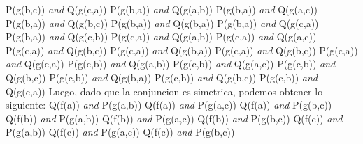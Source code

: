 \documentclass[12pt,a4paper,spanish]{article}
\begin{document}
\begin{enumerate}
   P(g(b,c)) \emph{and} Q(g(c,a))
   \newline
   \newline
   P(g(b,a)) \emph{and} Q(g(a,b))
   \newline
   P(g(b,a)) \emph{and} Q(g(a,c))
   \newline
   P(g(b,a)) \emph{and} Q(g(b,c))
   \newline
   P(g(b,a)) \emph{and} Q(g(b,a))
   \newline
   P(g(b,a)) \emph{and} Q(g(c,a))
   \newline
   P(g(b,a)) \emph{and} Q(g(c,b))
   \newline
   P(g(c,a)) \emph{and} Q(g(a,b))
   \newline
   P(g(c,a)) \emph{and} Q(g(a,c))
   \newline
   P(g(c,a)) \emph{and} Q(g(b,c))
   \newline
   P(g(c,a)) \emph{and} Q(g(b,a))
   \newline
   P(g(c,a)) \emph{and} Q(g(b,c))
   \newline
   P(g(c,a)) \emph{and} Q(g(c,a))
   \newline
   P(g(c,b)) \emph{and} Q(g(a,b))
   \newline
   P(g(c,b)) \emph{and} Q(g(a,c))
   \newline
   P(g(c,b)) \emph{and} Q(g(b,c))
   \newline
   P(g(c,b)) \emph{and} Q(g(b,a))
   \newline
   P(g(c,b)) \emph{and} Q(g(b,c))
   \newline
   P(g(c,b)) \emph{and} Q(g(c,a))
   \newline
   \newline   
   Luego, dado que la conjuncion es simetrica, podemos obtener lo siguiente:
   \newline
   Q(f(a)) \emph{and} P(g(a,b))
   \newline
   Q(f(a)) \emph{and} P(g(a,c))
   \newline
   Q(f(a)) \emph{and} P(g(b,c))
   \newline
   Q(f(b)) \emph{and} P(g(a,b))
   \newline
   Q(f(b)) \emph{and} P(g(a,c))
   \newline
   Q(f(b)) \emph{and} P(g(b,c))
   \newline
   Q(f(c)) \emph{and} P(g(a,b))
   \newline
   Q(f(c)) \emph{and} P(g(a,c))
   \newline
   Q(f(c)) \emph{and} P(g(b,c))
   \newline

\end{enumerate}
\end{document}
